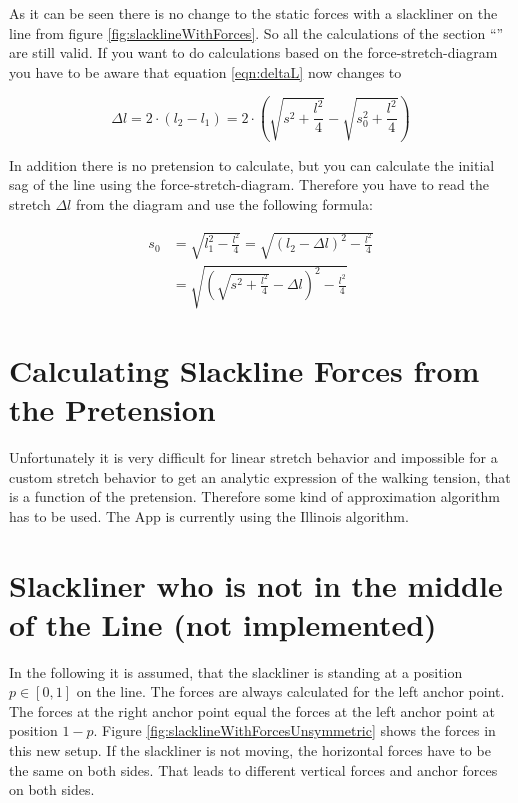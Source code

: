 As it can be seen there is no change to the static forces with a slackliner on the line from figure \ref{fig:slacklineWithForces}. So all the calculations of the section ``'' are still valid. If you want to do calculations based on the force-stretch-diagram you have to be aware that equation \ref{eqn:deltaL} now changes to

\begin{equation}
	\Delta l = 2\cdot (l_2 - l_1) = 2\cdot \left( \sqrt{s^2+\frac{l^2}{4}} - \sqrt{s_0^2+\frac{l^2}{4}}\right)
	\label{eqn:deltaLRodeo}
\end{equation}

In addition there is no pretension to calculate, but you can calculate the initial sag of the line using the force-stretch-diagram. Therefore you have to read the stretch $\Delta l$ from the diagram and use the following formula:

\begin{align}
	s_0 &= \sqrt{l_1^2 - \frac{l^2}{4}} = \sqrt{\left(l_2-\Delta l\right)^2 - \frac{l^2}{4}} \\
	&= \sqrt{\left( \sqrt{s^2 + \frac{l^2}{4}}  -\Delta l\right)^2 - \frac{l^2}{4}}
\end{align}

\section{Calculating Slackline Forces from the Pretension}

Unfortunately it is very difficult for linear stretch behavior and impossible for a custom stretch behavior to get an analytic expression of the walking tension, that is a function of the pretension. Therefore some kind of approximation algorithm has to be used. The App is currently using the Illinois algorithm.

\section{Slackliner who is not in the middle of the Line (not implemented)}

In the following it is assumed, that the slackliner is standing at a position $p \in [0,1]$ on the line. The forces are always calculated for the left anchor point. The forces at the right anchor point equal the forces at the left anchor point at position $1-p$. Figure \ref{fig:slacklineWithForcesUnsymmetric} shows the forces in this new setup. If the slackliner is not moving, the horizontal forces have to be the same on both sides. That leads to different vertical forces and anchor forces on both sides.

